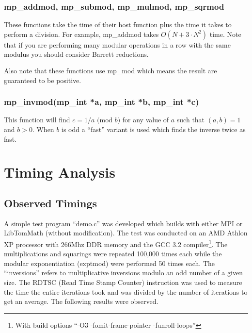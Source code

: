 \documentclass{article}
\begin{document}
\subsubsection{mp\_addmod, mp\_submod, mp\_mulmod, mp\_sqrmod}
These functions take the time of their host function plus the time it takes to perform a division.  For example, 
mp\_addmod takes $O(N + 3 \cdot N^2)$ time.  Note that if you are performing many modular operations in a row with
the same modulus you should consider Barrett reductions.  

Also note that these functions use mp\_mod which means the result are guaranteed to be positive.

\subsubsection{mp\_invmod(mp\_int *a, mp\_int *b, mp\_int *c)}
This function will find $c = 1/a \mbox{ (mod }b\mbox{)}$ for any value of $a$ such that $(a, b) = 1$ and $b > 0$.  When
$b$ is odd a ``fast'' variant is used which finds the inverse twice as fast.  

\section{Timing Analysis}
\subsection{Observed Timings}
A simple test program ``demo.c'' was developed which builds with either MPI or LibTomMath (without modification).  The
test was conducted on an AMD Athlon XP processor with 266Mhz DDR memory and the GCC 3.2 compiler\footnote{With build
options ``-O3 -fomit-frame-pointer -funroll-loops''}.    The multiplications and squarings were repeated 100,000 times 
each while the modular exponentiation (exptmod) were performed 50 times each.  The ``inversions'' refers to multiplicative
inversions modulo an odd number of a given size.  The RDTSC (Read Time Stamp Counter) instruction was used to measure the 
time the entire iterations took and was divided by the number of iterations to get an average.  The following results 
were observed.
\end{document}
